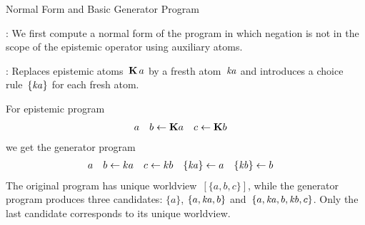 \documentclass[aspectratio=169,svgnames,xcolor=table,t]{beamer}
\begin{document}
\begin{frame}{Normal Form and Basic Generator Program}
    \begin{myitemize}
        \item {}: We first compute a normal form of the program in which negation is not in the scope of the epistemic operator using auxiliary atoms.
        
        \item {}: Replaces epistemic atoms~$\mathbf{K}\,a$ by a fresth atom~$\mathit{ka}$ and introduces a choice rule~$\{ \mathit{ka} \}$ for each fresh atom.
    \end{myitemize}
    For epistemic program
    \begin{align*}
        a && 
        b &\leftarrow \mathbf{K} a
        &
        c &\leftarrow \mathbf{K} b
    \end{align*}
    we get the generator program
    \begin{align*}
        a 
        && 
        b &\leftarrow ka
        &
        c &\leftarrow kb
        &
        \{ \mathit{ka} \} &\leftarrow a
        &
        \{ \mathit{kb} \} &\leftarrow b
    \end{align*}
    \pause
    The original program has unique worldview~$[\{a,b,c\}]$, while the generator program produces three candidates: $\{a\}$, $\{a,\mathit{ka},b\}$ and~$\{a,\mathit{ka},b,\mathit{kb},c\}$. Only the last candidate corresponds to its unique worldview.
\end{frame}

\newcommand{\lenitem}[2][.5\linewidth]{\parbox[t]{#1}{\strut #2\strut}}
\end{document}
